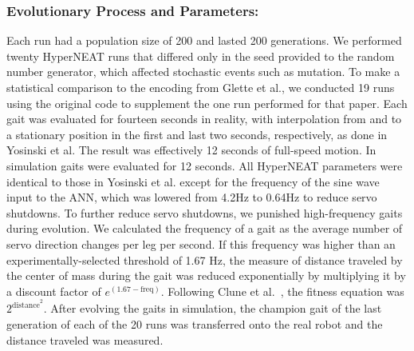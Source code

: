 
\subsubsection{Evolutionary Process and Parameters:}

Each run had a population size of 200 and lasted 200 generations. We performed twenty HyperNEAT runs that differed only in the seed provided to the random number generator, which affected stochastic events such as mutation. To make a statistical comparison to the encoding from Glette et al., we conducted 19 runs using the original code to supplement the one run performed for that paper. 
Each gait was evaluated for fourteen seconds in reality, with interpolation from and to a stationary position in the first and last two seconds, respectively, as done in Yosinski et al. The result was effectively 12 seconds of full-speed
motion. In simulation gaits were evaluated for 12 seconds. 
All HyperNEAT parameters were identical to those in Yosinski et al. except for the frequency of the sine wave input to the ANN, which was lowered from 4.2Hz to 0.64Hz to reduce servo shutdowns. 
To further reduce servo shutdowns, we punished high-frequency gaits during evolution. We calculated the frequency of a gait as the average number of servo direction changes per leg per second. If this frequency was higher than an experimentally-selected threshold of 1.67 Hz, the measure of distance traveled by the center of mass during the gait was reduced exponentially by multiplying it by a discount factor of $e^{(1.67-\mathrm{freq})}$. Following Clune et al.~\cite{clune2009evolving}, the fitness equation was $2^{\mathrm{distance}^{2}}$. After evolving the gaits in simulation, the champion gait of the last generation of each of the 20 runs was transferred onto the real robot and the distance traveled was measured. 

